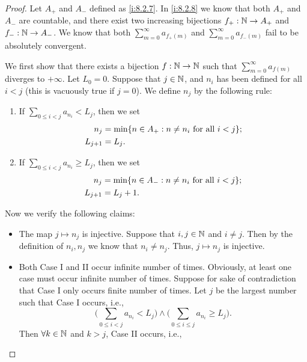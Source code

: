 \begin{proof}
  Let \(A_+\) and \(A_-\) defined as \cref{i:8.2.7}.
  In \cref{i:8.2.8} we know that both \(A_+\) and \(A_-\) are countable, and there exist two increasing bijections \(f_+ : \mathbb{N} \to A_+\) and \(f_- : \mathbb{N} \to A_-\).
  We know that both \(\sum_{m = 0}^\infty a_{f_+(m)}\) and \(\sum_{m = 0}^\infty a_{f_-(m)}\) fail to be absolutely convergent.

  We first show that there exists a bijection \(f : \mathbb{N} \to \mathbb{N}\) such that \(\sum_{m = 0}^\infty a_{f(m)}\) diverges to \(+\infty\).
  Let \(L_0 = 0\).
  Suppose that \(j \in \mathbb{N}\), and \(n_i\) has been defined for all \(i < j\)
  (this is vacuously true if \(j = 0\)).
  We define \(n_j\) by the following rule:
  \begin{enumerate}[label=(\Roman*)]
    \item If \(\sum_{0 \leq i < j} a_{n_i} < L_j\), then we set
          \begin{align*}
            n_j       & = \min\set{n \in A_+ : n \neq n_i \text{ for all } i < j}; \\
            L_{j + 1} & = L_j.
          \end{align*}
    \item If \(\sum_{0 \leq i < j} a_{n_i} \geq L_j\), then we set
          \begin{align*}
            n_j       & = \min\set{n \in A_- : n \neq n_i \text{ for all } i < j}; \\
            L_{j + 1} & = L_j + 1.
          \end{align*}
  \end{enumerate}
  Now we verify the following claims:
  \begin{itemize}
    \item The map \(j \mapsto n_j\) is injective.
          Suppose that \(i, j \in \mathbb{N}\) and \(i \neq j\).
          Then by the definition of \(n_i, n_j\) we know that \(n_i \neq n_j\).
          Thus, \(j \mapsto n_j\) is injective.
    \item Both Case I and II occur infinite number of times.
          Obviously, at least one case must occur infinite number of times.
          Suppose for sake of contradiction that Case I only occurs finite number of times.
          Let \(j\) be the largest number such that Case I occurs, i.e.,
          \[
            \Bigg(\sum_{0 \leq i < j} a_{n_i} < L_j\Bigg) \land \Bigg(\sum_{0 \leq i \leq j} a_{n_i} \geq L_j\Bigg).
          \]
          Then \(\forall k \in \mathbb{N}\) and \(k > j\), Case II occurs, i.e.,
          \[
\]
\end{itemize}
\end{proof}
